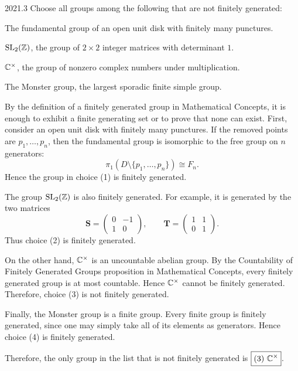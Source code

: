     \begin{pastproblem}{2021.3}
        Choose all groups among the following that are not finitely generated:
        \begin{problemchoices}
            \item The fundamental group of an open unit disk with finitely many punctures.
            \item \(\operatorname{SL}_2(\mathbb{Z})\), the group of \(2\times 2\) integer matrices with determinant \(1\).
            \item \(\mathbb{C}^{\times}\), the group of nonzero complex numbers under multiplication.
            \item The Monster group, the largest sporadic finite simple group.
        \end{problemchoices}
    \end{pastproblem}

    \begin{solution}
        By the definition of a finitely generated group in Mathematical Concepts,
        it is enough to exhibit a finite generating set or to prove that none can
        exist. First, consider an open unit disk with finitely many punctures. If
        the removed points are $p_1,\dots,p_n$, then the fundamental group is
        isomorphic to the free group on $n$ generators:
        \[
            \pi_1\left(D\setminus\{p_1,\dots,p_n\}\right)\cong F_n.
        \]
        Hence the group in choice (1) is finitely generated.

        The group $\operatorname{SL}_2(\mathbb{Z})$ is also finitely generated. For example, it is generated by the two
        matrices
        \[
            \mathbf{S}=
            \begin{pmatrix}
                0 & -1 \\
                1 & 0
            \end{pmatrix},
            \qquad
            \mathbf{T}=
            \begin{pmatrix}
                1 & 1 \\
                0 & 1
            \end{pmatrix}.
        \]
        Thus choice (2) is finitely generated.

        On the other hand, $\mathbb{C}^{\times}$ is an uncountable abelian group. By the
        Countability of Finitely Generated Groups proposition in Mathematical
        Concepts, every finitely generated group is at most countable. Hence
        $\mathbb{C}^{\times}$ cannot be finitely generated. Therefore, choice (3) is
        not finitely generated.

        Finally, the Monster group is a finite group. Every finite group is finitely generated,
        since one may simply take all of its elements as generators. Hence choice (4) is finitely
        generated.

        Therefore, the only group in the list that is not finitely generated is $\boxed{(3)\
        \mathbb{C}^{\times}}$.
    \end{solution}

